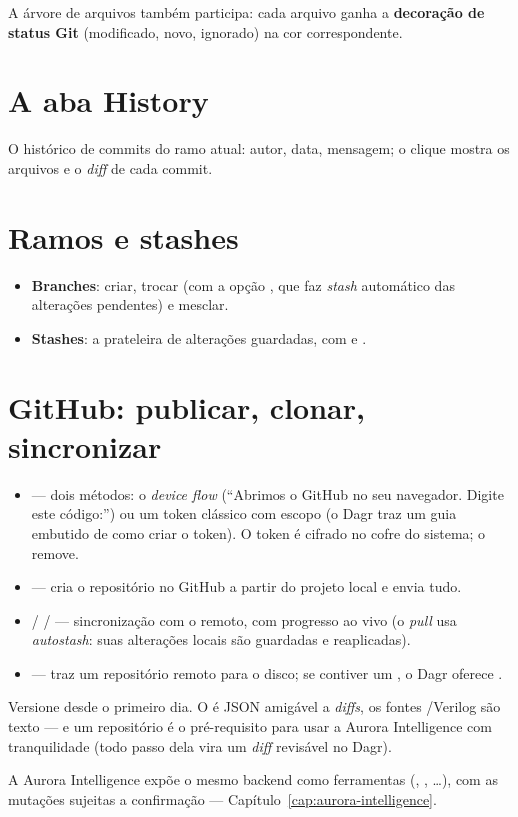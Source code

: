 A árvore de arquivos também participa: cada arquivo ganha a \textbf{decoração de status Git} (modificado, novo, ignorado) na cor correspondente.

\section{A aba History}

O histórico de commits do ramo atual: autor, data, mensagem; o clique mostra os arquivos e o \emph{diff} de cada commit.

\section{Ramos e stashes}

\begin{itemize}
  \item \textbf{Branches}: criar, trocar (com a opção , que faz \emph{stash} automático das alterações pendentes) e mesclar.
  \item \textbf{Stashes}: a prateleira de alterações guardadas, com  e .
\end{itemize}

\section{GitHub: publicar, clonar, sincronizar}

\begin{itemize}
  \item {} --- dois métodos: o \emph{device flow} (\enquote{Abrimos o GitHub no seu navegador. Digite este código:}) ou um token clássico com escopo  (o Dagr traz um guia embutido de como criar o token). O token é cifrado no cofre do sistema;  o remove.
  \item {} --- cria o repositório no GitHub a partir do projeto local e envia tudo.
  \item {} /  /  --- sincronização com o remoto, com progresso ao vivo (o \emph{pull} usa \emph{autostash}: suas alterações locais são guardadas e reaplicadas).
  \item {} --- traz um repositório remoto para o disco; se contiver um , o Dagr oferece .
\end{itemize}

\begin{nota}
Versione desde o primeiro dia. O  é JSON amigável a \emph{diffs}, os fontes \cmm{}/Verilog são texto --- e um repositório é o pré-requisito para usar a Aurora Intelligence com tranquilidade (todo passo dela vira um \emph{diff} revisável no Dagr).
\end{nota}

A Aurora Intelligence expõe o mesmo backend como ferramentas (, , \ldots), com as mutações sujeitas a confirmação --- Capítulo~\ref{cap:aurora-intelligence}.
